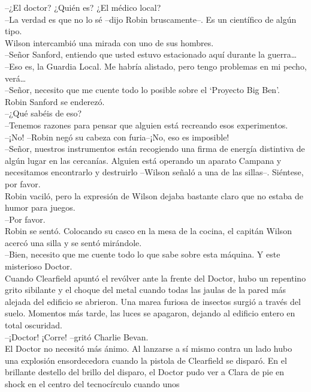 --¿El doctor? ¿Quién es? ¿El médico local?\\
--La verdad es que no lo sé --dijo Robin bruscamente--. Es un científico
de algún tipo.\\
Wilson intercambió una mirada con uno de sus hombres.\\
--Señor Sanford, entiendo que usted estuvo estacionado aquí durante la
guerra\ldots{}\\
--Eso es, la Guardia Local. Me habría alistado, pero tengo problemas en
mi pecho, verá\ldots{}\\
--Señor, necesito que me cuente todo lo posible sobre el `Proyecto Big
Ben'.\\
Robin Sanford se enderezó.\\
--¿Qué sabéis de eso?\\
--Tenemos razones para pensar que alguien está recreando esos
experimentos.\\
--¡No! --Robin negó su cabeza con furia--¡No, eso es imposible!\\
--Señor, nuestros instrumentos están recogiendo una firma de energía
distintiva de algún lugar en las cercanías. Alguien está operando un
aparato Campana y necesitamos encontrarlo y destruirlo --Wilson señaló a
una de las sillas--. Siéntese, por favor.\\
Robin vaciló, pero la expresión de Wilson dejaba bastante claro que no
estaba de humor para juegos.\\
--Por favor.\\
Robin se sentó. Colocando su casco en la mesa de la cocina, el capitán
Wilson acercó una silla y se sentó mirándole.\\
--Bien, necesito que me cuente todo lo que sabe sobre esta máquina. Y
este misterioso Doctor.\\[2\baselineskip]Cuando Clearfield apuntó el
revólver ante la frente del Doctor, hubo un repentino grito sibilante y
el choque del metal cuando todas las jaulas de la pared más alejada del
edificio se abrieron. Una marea furiosa de insectos surgió a través del
suelo. Momentos más tarde, las luces se apagaron, dejando al edificio
entero en total oscuridad.\\
--¡Doctor! ¡Corre! --gritó Charlie Bevan.\\
El Doctor no necesitó más ánimo. Al lanzarse a sí mismo contra un lado
hubo una explosión ensordecedora cuando la pistola de Clearfield se
disparó. En el brillante destello del brillo del disparo, el Doctor pudo
ver a Clara de pie en shock en el centro del tecnocírculo cuando unos
